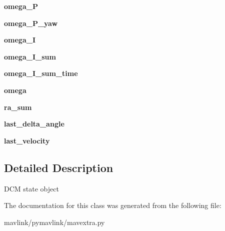 \begin{DoxyCompactItemize}
{\bfseries omega\+\_\+P}
\item 
\mbox{\label{classpymavlink_1_1mavextra_1_1DCM__State_a1dd12e84153fffce4852b2f695c99faf}} 
{\bfseries omega\+\_\+\+P\+\_\+yaw}
\item 
\mbox{\label{classpymavlink_1_1mavextra_1_1DCM__State_a8f84e96ad236ec88b7021c217e0793a1}} 
{\bfseries omega\+\_\+I}
\item 
\mbox{\label{classpymavlink_1_1mavextra_1_1DCM__State_a58b21b469aa1f0e4abc2d8043f5b7b09}} 
{\bfseries omega\+\_\+\+I\+\_\+sum}
\item 
\mbox{\label{classpymavlink_1_1mavextra_1_1DCM__State_ad2908f8fe18ebea6209ab2be9f9e4be4}} 
{\bfseries omega\+\_\+\+I\+\_\+sum\+\_\+time}
\item 
\mbox{\label{classpymavlink_1_1mavextra_1_1DCM__State_a95544c6b3aafe46c2faf9e650bfe15a3}} 
{\bfseries omega}
\item 
\mbox{\label{classpymavlink_1_1mavextra_1_1DCM__State_a6a4dfa55567c0993a4bfaac87540fcd9}} 
{\bfseries ra\+\_\+sum}
\item 
\mbox{\label{classpymavlink_1_1mavextra_1_1DCM__State_ae6071d18abe3032886035efefb049eef}} 
{\bfseries last\+\_\+delta\+\_\+angle}
\item 
\mbox{\label{classpymavlink_1_1mavextra_1_1DCM__State_ad4c4248dd987046009832718babf1646}} 
{\bfseries last\+\_\+velocity}
\end{DoxyCompactItemize}


\subsection{Detailed Description}
\begin{DoxyVerb}DCM state object\end{DoxyVerb}
 

The documentation for this class was generated from the following file\+:\begin{DoxyCompactItemize}
\item 
mavlink/pymavlink/mavextra.\+py\end{DoxyCompactItemize}
